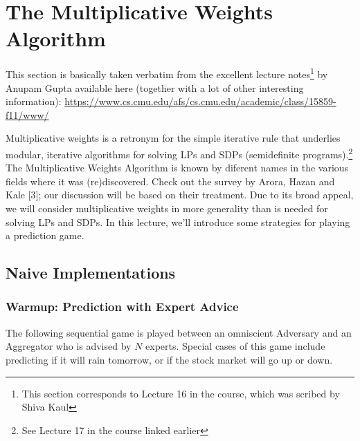 % 
\chapter{The Multiplicative Weights Algorithm}

This section is basically taken verbatim from the excellent lecture notes\footnote{This section
corresponds to Lecture 16 in the course, which was scribed by Shiva Kaul} by Anupam Gupta available
here (together with a lot of other interesting information):
\url{https://www.cs.cmu.edu/afs/cs.cmu.edu/academic/class/15859-f11/www/}

Multiplicative weights is a retronym for the simple iterative rule that underlies modular,
iterative algorithms for solving LPs and SDPs (semidefinite programs).\footnote{See Lecture 17 in
the course linked earlier} The Multiplicative Weights Algorithm is known by diferent names in the
various fields where it was (re)discovered. Check out the survey by Arora, Hazan and Kale [3]; our
discussion will be based on their treatment. Due to its broad appeal, we will consider
multiplicative weights in more generality than is needed for solving LPs and SDPs. In this
lecture, we'll introduce some strategies for playing a prediction game.

\section{Naive Implementations}

\subsection{Warmup: Prediction with Expert Advice}

The following sequential game is played between an omniscient Adversary and an Aggregator who is
advised by $N$ experts. Special cases of this game include predicting if it will rain tomorrow, or
if the stock market will go up or down.

\bigskip
\noindent{}
\bigskip

